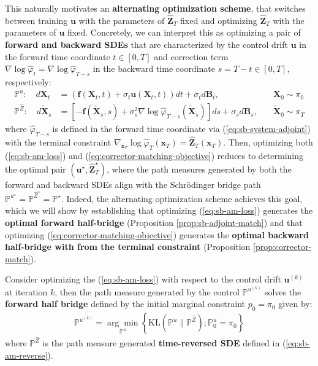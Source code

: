 \documentclass{article}
\begin{document}
This naturally motivates an \textbf{alternating optimization scheme}, that switches between training $\boldsymbol{u}$ with the parameters of $\widehat{\boldsymbol{Z}}_T$ fixed and optimizing $\widehat{\boldsymbol{Z}}_T$ with the parameters of $\boldsymbol{u}$ fixed. Concretely, we can interpret this as optimizing a pair of \textbf{forward and backward SDEs} that are characterized by the control drift $\boldsymbol{u}$ in the forward time coordinate $t\in [0,T]$ and correction term $\nabla \log \hat{\varphi}_t=\nabla \log \hat{\varphi}_{T-s}$ in the backward time coordinate $s=T-t\in [0,T]$, respectively:
\begin{align}
    \mathbb{P}^u: \quad d\boldsymbol{X}_t&=\left(\boldsymbol{f}(\boldsymbol{X}_t, t)+\sigma_t\boldsymbol{u}(\boldsymbol{X}_t,t)\right)dt+\sigma_td\boldsymbol{B}_t, \quad &\boldsymbol{X}_0\sim \pi_0\label{eq:sb-am-forward}\\
    \mathbb{P}^{\widehat{Z}}: \quad d\tilde{\boldsymbol{X}}_s&=\left[-\boldsymbol{f}(\tilde{\boldsymbol{X}}_s,s)+\sigma^2_s\nabla \log \hat{\varphi}_{T-s}(\tilde{\boldsymbol{X}}_s)\right]ds+\sigma_sd\boldsymbol{B}_s, \quad &\tilde{\boldsymbol{X}}_0\sim \pi_T\label{eq:sb-am-reverse}
\end{align}
where $\hat{\varphi}_{T-s}$ is defined in the forward time coordinate via (\ref{eq:sb-system-adjoint}) with the terminal constraint $\nabla_{\boldsymbol{x}_T}\log\hat{\varphi}_T(\boldsymbol{x}_T)=\widehat{\boldsymbol{Z}}_T(\boldsymbol{x}_T)$. Then, optimizing both (\ref{eq:sb-am-loss}) and (\ref{eq:corrector-matching-objective}) reduces to determining the optimal pair $(\boldsymbol{u}^\star, \widehat{\boldsymbol{Z}}^\star_T)$, where the path measures generated by both the forward and backward SDEs align with the Schrödinger bridge path $\mathbb{P}^{u^\star}=\mathbb{P}^{\widehat{Z}^\star}=\mathbb{P}^\star$. Indeed, the alternating optimization scheme achieves this goal, which we will show by establishing that optimizing (\ref{eq:sb-am-loss}) generates the \textbf{optimal forward half-bridge} (Proposition \ref{prop:sb-adjoint-match}) and that optimizing (\ref{eq:corrector-matching-objective}) generates the \textbf{optimal backward half-bridge with from the terminal constraint} (Proposition \ref{prop:corrector-match}).

\begin{proposition}\label{prop:sb-adjoint-match}
    Consider optimizing the (\ref{eq:sb-am-loss}) with respect to the control drift $\boldsymbol{u}^{(k)}$ at iteration $k$, then the path measure generated by the control $\mathbb{P}^{u^{(k)}}$ solves the \textbf{forward half bridge} defined by the initial marginal constraint $p_0=\pi_0$ given by:
    \begin{align}
        \mathbb{P}^{u^{(k)}}=\underset{\mathbb{P}^u}{\arg\min}\left\{\text{KL}(\mathbb{P}^u\|\mathbb{P}^{\widehat{Z}}); \mathbb{P}^u_0=\pi_0 \right\}
    \end{align}
    where $\mathbb{P}^{\widehat{Z}}$ is the path measure generated \textbf{time-reversed SDE} defined in (\ref{eq:sb-am-reverse}).
\end{proposition}
\end{document}
